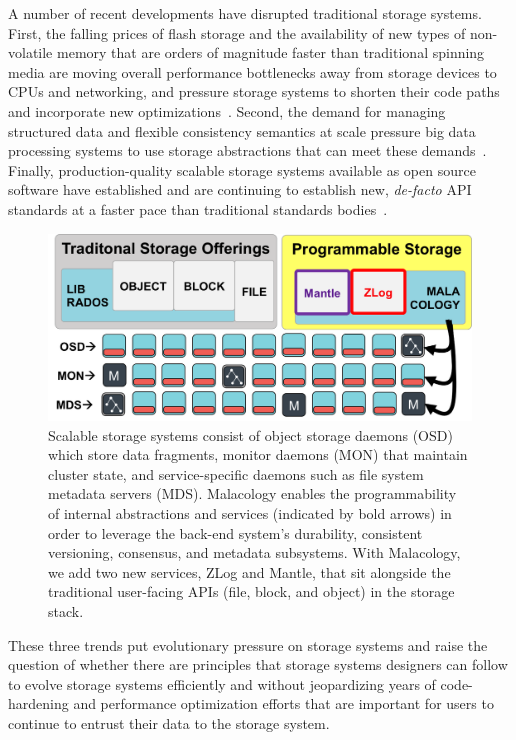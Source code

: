 \documentclass[preprint]{sigplanconf-eurosys}
\begin{document}
A number of recent developments have disrupted traditional storage systems.
First, the falling prices of flash storage and the availability of new types of
non-volatile memory that are orders of magnitude faster than traditional
spinning media are moving overall performance bottlenecks away from storage
devices to CPUs and networking, and pressure storage systems to shorten their
code paths and incorporate new
optimizations~\cite{gray_tape_2007,gray_flash_2008}. Second, the demand for
managing structured data and flexible consistency semantics at scale pressure
big data processing systems to use storage abstractions that can meet these
demands~\cite{apache_contributors_parquet_2014}. Finally, production-quality
scalable storage systems available as open source software have established and
are continuing to establish new, \emph{de-facto} API standards at a faster pace
than traditional standards
bodies~\cite{snia_implementing_2014,linux_foundation_kinetic_2015}.

\begin{figure}[tb]
\centering
\includegraphics{figures/overview.png}

\caption{Scalable storage systems consist of object storage daemons (OSD) which
store data fragments, monitor daemons (MON) that maintain cluster state, and
service-specific daemons such as file system metadata servers (MDS). Malacology
enables the programmability of internal abstractions and services (indicated by
bold arrows) in order to leverage the back-end system's durability, consistent
versioning, consensus, and metadata subsystems.  With Malacology, we add two
new services, ZLog and Mantle, that sit alongside the traditional user-facing
APIs (file, block, and object) in the storage stack.  \label{fig:overview}}
\end{figure}

These three trends put evolutionary pressure on storage systems and raise the
question of whether there are principles that storage systems designers can follow
to evolve storage systems efficiently and without jeopardizing years of
code-hardening and performance optimization efforts that are important for
users to continue to entrust their data to the storage system.
\end{document}
